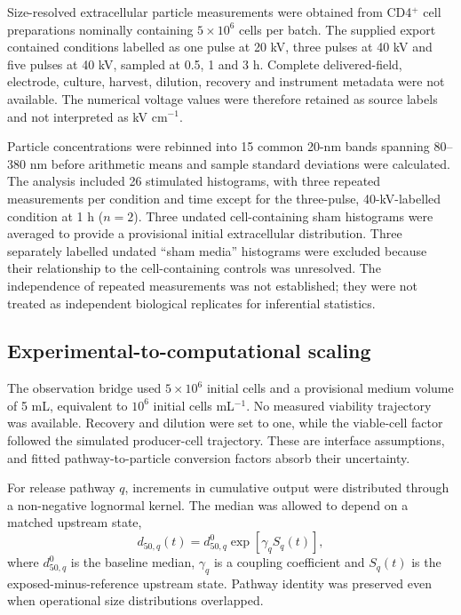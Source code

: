 Size-resolved extracellular particle measurements were obtained from CD4$^+$ cell preparations nominally containing $5\times10^6$ cells per batch. The supplied export contained conditions labelled as one pulse at 20 kV, three pulses at 40 kV and five pulses at 40 kV, sampled at 0.5, 1 and 3 h. Complete delivered-field, electrode, culture, harvest, dilution, recovery and instrument metadata were not available. The numerical voltage values were therefore retained as source labels and not interpreted as kV cm$^{-1}$.

Particle concentrations were rebinned into 15 common 20-nm bands spanning 80--380 nm before arithmetic means and sample standard deviations were calculated. The analysis included 26 stimulated histograms, with three repeated measurements per condition and time except for the three-pulse, 40-kV-labelled condition at 1 h ($n=2$). Three undated cell-containing sham histograms were averaged to provide a provisional initial extracellular distribution. Three separately labelled undated ``sham media'' histograms were excluded because their relationship to the cell-containing controls was unresolved. The independence of repeated measurements was not established; they were not treated as independent biological replicates for inferential statistics.

\subsection*{Experimental-to-computational scaling}

The observation bridge used $5\times10^6$ initial cells and a provisional medium volume of 5 mL, equivalent to $10^6$ initial cells mL$^{-1}$. No measured viability trajectory was available. Recovery and dilution were set to one, while the viable-cell factor followed the simulated producer-cell trajectory. These are interface assumptions, and fitted pathway-to-particle conversion factors absorb their uncertainty.

For release pathway $q$, increments in cumulative output were distributed through a non-negative lognormal kernel. The median was allowed to depend on a matched upstream state,
\begin{equation}
d_{50,q}(t)=d_{50,q}^{0}\exp[\gamma_qS_q(t)],
\end{equation}
where $d_{50,q}^{0}$ is the baseline median, $\gamma_q$ is a coupling coefficient and $S_q(t)$ is the exposed-minus-reference upstream state. Pathway identity was preserved even when operational size distributions overlapped.

